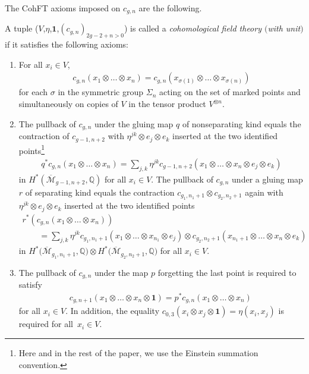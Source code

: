 \documentclass[10pt,a4paper]{amsart}
\def\oM{\overline{\mathcal{M}}}
\def\b1{{\mathbf 1}}
\numberwithin{equation}{section}
\begin{document}
The CohFT axioms imposed on $c_{g,n}$ are the following.

\begin{Definition}\label{defcohft}
A tuple ($V$,$\eta$,$\b1$,$(c_{g,n})_{2g-2+n>0}$) is called a {\em cohomological field theory $($with unit$)$} if it satisfies the following axioms:
\begin{enumerate}\itemsep=0pt
\item[(i)] For all $x_i \in V$,
\begin{align*}
c_{g,n}(x_1\otimes \dots \otimes x_n) = c_{g,n}(x_{\sigma(1)}\otimes \dots \otimes x_{\sigma(n)})
\end{align*}
for each $\sigma$ in the symmetric group $\Sigma_n$ acting on the set of marked points and simultaneously on
copies of $V$ in the tensor product $V^{\otimes n}$.
\item[(ii)] The pullback of $c_{g,n}$ under the gluing map $q$ of nonseparating kind equals the contraction of $c_{g-1,n+2}$ with
$\eta^{jk}\otimes e_j \otimes e_k$ inserted at the two identified points\footnote{Here and in the rest of the paper, we use the Einstein summation convention.}
\begin{align*}
q^*c_{g,n}(x_1\otimes \dots \otimes x_n) =
\sum_{j,k} \eta^{jk} c_{g-1,n+2}(x_1\otimes \dots \otimes x_n \otimes e_j \otimes e_k)
\end{align*}
in $H^*(\oM_{g-1,n+2},\mathbb{Q})$ for all $x_i \in V$.
The pullback of $c_{g,n}$ under a gluing map $r$ of separating kind equals the contraction $c_{g_1, n_1+1} \otimes c_{g_2, n_2+1}$ again with $\eta^{jk}\otimes e_j \otimes e_k$ inserted at the two identified points
\begin{gather*}
r^*(c_{g,n}(x_1\otimes \dots \otimes x_n)) \\
\qquad=\sum_{j,k} \eta^{jk} c_{g_1,n_1+1}(x_1\otimes \dots \otimes x_{n_1}\otimes e_j) \otimes
c_{g_2,n_2+1}(x_{n_1+1}\otimes \dots \otimes x_n \otimes e_k)
\end{gather*}
in $H^*\big(\oM_{g_1,{n_1+1}},\mathbb{Q}\big) \otimes
H^*\big(\oM_{g_2,{n_2+1}},\mathbb{Q}\big)$ for all $x_i \in V$.

\item[(iii)]The pullback of $c_{g,n}$ under the map $p$ forgetting the last point is required to satisfy
\begin{align*}
c_{g,n+1}(x_1\otimes \dots \otimes x_n \otimes \b1) = p^*c_{g,n} (x_1\otimes \dots \otimes x_n)\
\end{align*}
for all $x_i \in V$.
In addition, the equality
$
c_{0,3}(x_i\otimes x_j\otimes \b1) = \eta(x_i,x_j)
$
is required for all~${x_i \in V}$.
\end{enumerate}
\end{Definition}
\end{document}
